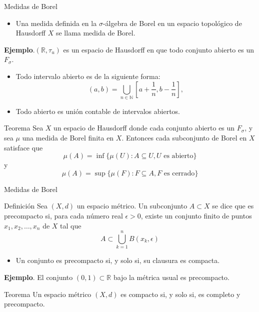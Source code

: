 \documentclass[8pt]{beamer}
\begin{document}
\begin{frame}{Medidas de Borel}
\begin{itemize}
    \item Una medida definida en la $\sigma$-álgebra de Borel en un espacio topológico de Hausdorff $X$ se llama medida de Borel. 
\end{itemize}
\medskip 
\pause

\textbf{Ejemplo}.$(\mathbb R, \tau_u)$ es un espacio de Hausdorff en que todo conjunto abierto es un $F_\sigma$.
   \begin{itemize}
       \item Todo intervalo abierto es de la siguiente forma: 
       \[
        (a,b) = \bigcup_{n \in \mathbb{N}} \left[a + \frac{1}{n}, b - \frac{1}{n}\right],
   \]
   \item Todo abierto es unión contable de intervalos abiertos. 
   \end{itemize}
\pause

     \begin{block}{Teorema}
        Sea $X$ un espacio de Hausdorff donde cada conjunto abierto es un $F_\sigma$, y sea $\mu$ una medida de Borel finita en $X$. Entonces cada subconjunto de Borel en $X$ satisface que 
    \begin{equation}
    \label{eq: mu abierto}
        \mu(A) = \inf \{\mu(U): A \subseteq U, U \text{ es abierto}\}
    \end{equation}
    y
    \begin{equation}
    \label{eq: mu cerrado}
        \mu(A) = \sup \{\mu(F): F \subseteq A, F \text{ es cerrado}\}
    \end{equation}
    \end{block}
\end{frame}

\begin{frame}{Medidas de Borel}
    \begin{block}{Definición}
           Sea $(X,d)$ un espacio métrico. Un subconjunto $A \subset X$ se dice que es precompacto si, para cada número real $\epsilon >0$, existe un conjunto finito de puntos $x_1, x_2,\dots, x_n$ de $X$ tal que 
    \begin{equation*}
        A \subset \bigcup_{k=1}^nB(x_k,\epsilon)
    \end{equation*}
    \end{block}
    \begin{itemize}
        \item Un conjunto es precompacto si, y solo si, su clausura es compacta.
    \end{itemize}
    \pause
        \textbf{Ejemplo}. El conjunto $(0,1) \subset \mathbb R$ bajo la métrica usual es precompacto. 
        \pause
    \begin{block}{Teorema}
            Un espacio métrico $(X,d)$ es compacto si, y solo si, es completo y precompacto. 
    \end{block}
\end{frame}
\end{document}
